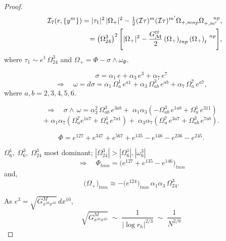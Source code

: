 \documentclass[a4paper,11pt,fleqn]{article}
\theoremstyle{plain}
\theoremstyle{definition}
\begin{document}
\begin{proof}
\begin{eqnarray}
\label{LagB-i}
& &   \mathcal{I}_7(r, \left\{y^m\right\})
  = |\tau_1|^2\,|\Omega_+|^2
          - \tfrac{1}{2}(\mathcal{I}\tau)^{m}(\mathcal{I}\tau)^{m'}\Omega_{+, mnp}\Omega_{+, m'}^{\ \ \ \ np},\nonumber\\
& & = \left(\Omega^3_{24}\right)^2\Biggl[|\Omega_+|^2 - \frac{G_{\cal M}^{tt}}{2}\left(\Omega_+\right)_{tnp}\left(\Omega_+\right)_t^{\ \ np}\Biggr],
\end{eqnarray}
\noindent where $\tau_1 \sim e^1\,\Omega^3_{24}$ and
$\Omega_+ = \Phi - \sigma\wedge \omega_\Phi$.


\[
  \sigma = \alpha_1\,e + \alpha_3\,e^3 + \alpha_7\,e^7
\]
\[
  \Rightarrow\quad \omega = d\sigma
  = \alpha_1\,\Omega_a^1\,e^{a1}
        + \alpha_3\,\Omega^3_{ab}\, e^{ab}
    + \alpha_7\,\Omega_a^7\,e^{a7},
\]
\noindent where $a, b = 2, 3, 4, 5, 6$.

\[
  \Rightarrow\quad \sigma\wedge \,\omega
  =  \alpha_3^2\,\Omega^3_{ab}\,e^{3 a b}
      +\; \alpha_1\alpha_3\!\left(-\Omega^3_{ab}\,e^{1 a b}
    + \Omega^1_a\,e^{3 1 1}\right)
\]
\[
  +\; \alpha_1\alpha_7\!\left(\Omega^7_a e^{1a7}
    + \Omega^1_a\,e^{7a1}\right)
  +\; \alpha_3\alpha_7\!\left(\Omega^7_{a}\,e^{3a7}
    + \Omega^3_{ab}\,e^{7 a b}\right).
\]

\[
  \Phi = e^{127} + e^{347} + e^{567} + e^{135} - e^{146} - e^{236} - e^{245}.
\]

$\Omega_6^1,\;\Omega_6^3,\;\Omega_{24}^3$ most dominant; $|\Omega^3_{24}|>|\Omega_6^1|, |\omega_6^3|$
\[
  \Rightarrow\quad
  \Phi_{tmn} = \bigl(e^{127} + e^{135} - e^{146}\bigr)_{tmn}
\]
and,
\[
    \bigl(\Omega_{+}\bigr)_{tmn}
    \approx -\bigl(e^{124}\bigr)_{tmn}\,\alpha_1\alpha_3\,\Omega_{24}^3.
\]

\bigskip

\noindent As $e^3 = \sqrt{G_{x^{10}x^{10}}^M}\,dx^{10}$,
\[
  \sqrt{G_{x^{10}x^{10}}^M}
  \;\sim\; \frac{1}{{|\log r_h|}^{2/3}}
  \;\sim\; \frac{1}{N^{2/9}}
\]


\end{proof}
\end{document}
